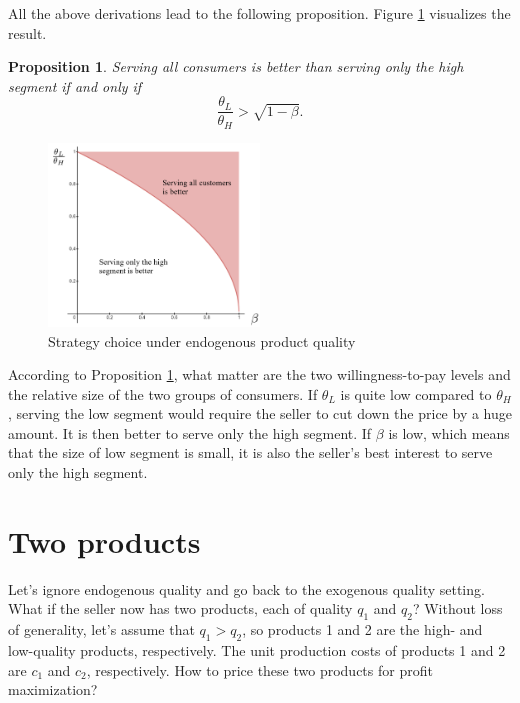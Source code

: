 \documentclass[11pt,a4paper]{article}
\newtheorem{prop}{Proposition}
\begin{document}
All the above derivations lead to the following proposition. Figure \ref{fig:strategy} visualizes the result.

\begin{prop}\label{prop:strategy}
	Serving all consumers is better than serving only the high segment if and only if
	\[
		\frac{\theta_L}{\theta_H} > \sqrt{1 - \beta}.
	\]
\end{prop}

\begin{figure}[hbt]
	\centering
	\includegraphics[width=0.5\textwidth]{figures/strategy}
	\caption{Strategy choice under endogenous product quality}
	\label{fig:strategy}
\end{figure}

According to Proposition \ref{prop:strategy}, what matter are the two willingness-to-pay levels and the relative size of the two groups of consumers. If $\theta_L$ is quite low compared to $\theta_H$, serving the low segment would require the seller to cut down the price by a huge amount. It is then better to serve only the high segment. If $\beta$ is low, which means that the size of low segment is small, it is also the seller's best interest to serve only the high segment.











\section{Two products}

Let's ignore endogenous quality and go back to the exogenous quality setting.
What if the seller now has two products, each of quality $q_1$ and $q_2$?
Without loss of generality, let's assume that $q_1 > q_2$,
so products 1 and 2 are the high- and low-quality products, respectively.
The unit production costs of products 1 and 2 are $c_1$ and $c_2$, respectively.
How to price these two products for profit maximization?
\end{document}
